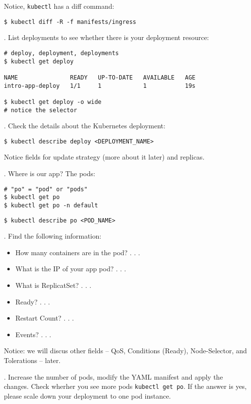 \documentclass[12pt, letterpaper]{article}
\begin{document}
\bigskip
Notice, \verb|kubectl| has a diff command:
\begin{verbatim}
$ kubectl diff -R -f manifests/ingress
\end{verbatim}

. List deployments to see whether there is your deployment resource:

\begin{verbatim}
# deploy, deployment, deployments
$ kubectl get deploy

NAME               READY   UP-TO-DATE   AVAILABLE   AGE
intro-app-deploy   1/1     1            1           19s

$ kubectl get deploy -o wide
# notice the selector

\end{verbatim}

. Check the details about the Kubernetes deployment:

\begin{verbatim}
$ kubectl describe deploy <DEPLOYMENT_NAME>
\end{verbatim}

Notice fields for update strategy (more about it later) and replicas.

. Where is our app? The pods:

\begin{verbatim}
# "po" = "pod" or "pods"
$ kubectl get po
$ kubectl get po -n default
\end{verbatim}

\begin{verbatim}
$ kubectl describe po <POD_NAME>
\end{verbatim}

. Find the following information:
\begin{itemize}
    \item How many containers are in the pod? . . .
    \item What is the IP of your app pod? . . .
    \item What is ReplicatSet? . . .
    \item Ready? . . .
    \item Restart Count? . . .
    \item Events? . . .
\end{itemize}

Notice: we will discus other fields -- QoS, Conditions (Ready), Node-Selector, and Tolerations -- later.%

. Increase the number of pods, modify the {\small YAML} manifest and apply the changes. Check wherher you see more pods \verb|kubectl get po|. If the answer is yes, please scale down your deployment to one pod instance.%
\end{document}
